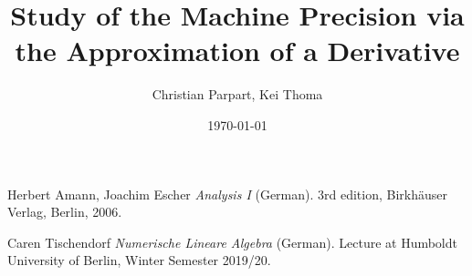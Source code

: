 \documentclass[a4paper,12pt]{scrartcl}
\title{Study of the Machine Precision via the Approximation of a Derivative}
\author{Christian Parpart, Kei Thoma}
\date{\today}
\begin{document}
\maketitle
\tableofcontents






\begin{thebibliography}{2}

Herbert Amann, Joachim Escher
\textit{Analysis I} (German). 
3rd edition, Birkh{\"a}user Verlag, Berlin, 2006.

Caren Tischendorf
\textit{Numerische Lineare Algebra} (German).
Lecture at Humboldt University of Berlin, Winter Semester 2019/20.

\end{thebibliography}
\end{document}
